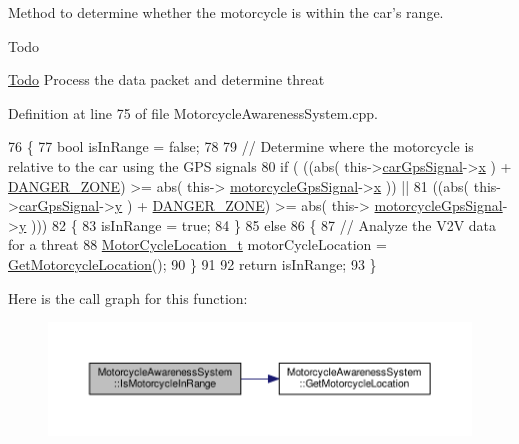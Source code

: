 Method to determine whether the motorcycle is within the car's range. 

\begin{DoxyRefDesc}{Todo}
\item[\hyperlink{todo__todo000001}{Todo}]Process the data packet and determine threat \end{DoxyRefDesc}


Definition at line 75 of file Motorcycle\-Awareness\-System.\-cpp.


\begin{DoxyCode}
76 \{
77     \textcolor{keywordtype}{bool} isInRange = \textcolor{keyword}{false};
78 
79     \textcolor{comment}{// Determine where the motorcycle is relative to the car using the GPS signals}
80     \textcolor{keywordflow}{if} ( ((abs( this->\hyperlink{classMotorcycleAwarenessSystem_a9a8185e00b60d0be58bfa76166063128}{carGpsSignal}->\hyperlink{structGpsSignal__t_a6f7bd3c500b55923ab335ada4b6b26eb}{x} ) + \hyperlink{classMotorcycleAwarenessSystem_abe0296f34c0ca2857a94659dfdc5801c}{DANGER\_ZONE}) >= abs( this->
      \hyperlink{classMotorcycleAwarenessSystem_ab281a3993b574923b2f379ed0477b2d4}{motorcycleGpsSignal}->\hyperlink{structGpsSignal__t_a6f7bd3c500b55923ab335ada4b6b26eb}{x} )) ||
81          ((abs( this->\hyperlink{classMotorcycleAwarenessSystem_a9a8185e00b60d0be58bfa76166063128}{carGpsSignal}->\hyperlink{structGpsSignal__t_ab9e083be189fc842ed7aa4fdc978e94e}{y} ) + \hyperlink{classMotorcycleAwarenessSystem_abe0296f34c0ca2857a94659dfdc5801c}{DANGER\_ZONE}) >= abs( this->
      \hyperlink{classMotorcycleAwarenessSystem_ab281a3993b574923b2f379ed0477b2d4}{motorcycleGpsSignal}->\hyperlink{structGpsSignal__t_ab9e083be189fc842ed7aa4fdc978e94e}{y} )))
82     \{
83         isInRange = \textcolor{keyword}{true};
84     \}
85     \textcolor{keywordflow}{else}
86     \{
87         \textcolor{comment}{// Analyze the V2V data for a threat}
88         \hyperlink{structMotorCycleLocation__t}{MotorCycleLocation\_t} motorCycleLocation = 
      \hyperlink{classMotorcycleAwarenessSystem_a840a5bc17d75276ecdb3a39d7aaf4109}{GetMotorcycleLocation}();
90     \}
91 
92     \textcolor{keywordflow}{return} isInRange;
93 \}
\end{DoxyCode}


Here is the call graph for this function\-:\nopagebreak
\begin{figure}[H]
\begin{center}
\leavevmode
\includegraphics[width=350pt]{classMotorcycleAwarenessSystem_a239655aca9c875b1dbbad3ce155c7892_cgraph}
\end{center}
\end{figure}




